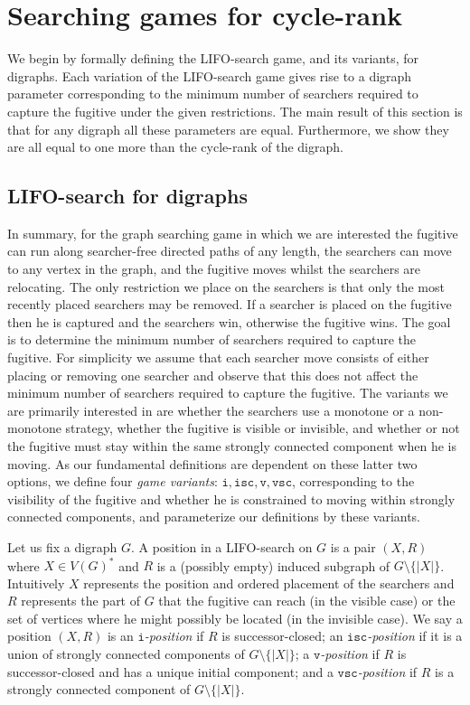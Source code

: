 \documentclass{llncs}
\newcommand{\letters}[1]{\{\!|#1|\!\}}
\newcommand{\ivar}{\texttt{i}}
\newcommand{\vvar}{\texttt{v}}
\newcommand{\iscvar}{\texttt{isc}}
\newcommand{\vscvar}{\texttt{vsc}}
\begin{document}
\section{Searching games for cycle-rank}\label{sec:game}
We begin by formally defining the LIFO-search game, and its variants, for digraphs.  Each variation of the LIFO-search game gives rise to a digraph parameter corresponding to the minimum number of searchers required to capture the fugitive under the given restrictions.  The main result of this section is that for any digraph all these parameters are equal.  Furthermore, we show they are all equal to
one more than the cycle-rank of the digraph.

\subsection{LIFO-search for digraphs}
In summary, for the graph searching game in which we are interested the fugitive can run along searcher-free directed paths of any length, the searchers can move to any vertex in the graph, and the fugitive moves whilst the searchers are relocating.
The only restriction we place on the searchers is that only the most recently placed searchers may be removed.   If a searcher is placed on the fugitive then he is captured and the searchers win,  otherwise the fugitive wins.
The goal is to determine the minimum number of searchers required to capture the fugitive.  For simplicity we assume that each searcher move consists of either placing or removing one searcher and observe that this does not affect the minimum number of searchers required to capture the fugitive.
The variants we are primarily interested in are whether the searchers use a monotone or a non-monotone strategy, whether the fugitive is visible or invisible, and whether or not the fugitive must stay within the same strongly connected component when he is moving.   As our fundamental definitions are dependent on these latter two options, we define four \emph{game variants}: $\ivar, \iscvar, \vvar, \vscvar$, corresponding to the visibility of the fugitive and whether he is constrained to moving within strongly connected components, and parameterize our definitions by these variants.


Let us fix a digraph $G$.  A position in a LIFO-search on $G$ is a pair $(X,R)$ where $X \in V(G)^*$ and $R$ is a (possibly empty) induced subgraph of $G \setminus \letters{X}$.  Intuitively $X$ represents the position and ordered placement of the searchers and $R$ represents the part of $G$ that the fugitive can reach (in the visible case) or the set of vertices where he might possibly be located (in the invisible case).
We say a position $(X,R)$ is an \emph{$\ivar$-position} if $R$ is successor-closed;  an \emph{$\iscvar$-position} if it is a union of strongly connected components of $G \setminus \letters{X}$; a \emph{$\vvar$-position} if $R$ is successor-closed and has a unique initial component; and a \emph{$\vscvar$-position} if $R$ is a strongly connected component of $G \setminus \letters{X}$.
   
\end{document}
